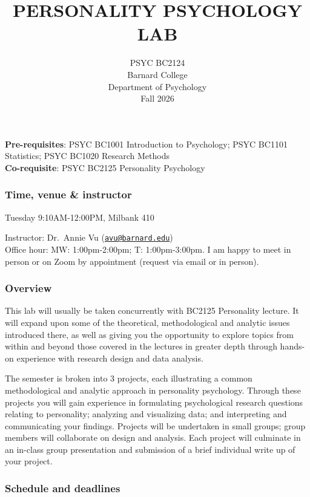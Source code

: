 \documentclass[
  letterpaper,
  DIV=11,
  numbers=noendperiod]{scrartcl}
\title{PERSONALITY PSYCHOLOGY LAB}
\subtitle{PSYC BC2124\\
Barnard College\\
Department of Psychology\\
Fall 2026}
\author{}
\date{}
\begin{document}
\maketitle


\textbf{Pre-requisites}: PSYC BC1001 Introduction to Psychology; PSYC
BC1101 Statistics; PSYC BC1020 Research Methods\\
\textbf{Co-requisite}: PSYC BC2125 Personality Psychology

\subsubsection{Time, venue \& instructor}\label{time-venue-instructor}

Tuesday 9:10AM-12:00PM, Milbank 410

Instructor: Dr.~Annie Vu
(\href{mailto:avu@barnard.edu}{\nolinkurl{avu@barnard.edu}})\\
Office hour: MW: 1:00pm-2:00pm; T: 1:00pm-3:00pm. I am happy to meet in person or on Zoom by appointment (request via email or in person).



\subsubsection{Overview}\label{overview}

This lab will usually be taken concurrently with BC2125 Personality
lecture. It will expand upon some of the theoretical, methodological and
analytic issues introduced there, as well as giving you the opportunity
to explore topics from within and beyond those covered in the lectures
in greater depth through hands-on experience with research design and
data analysis.

The semester is broken into 3 projects, each illustrating a common
methodological and analytic approach in personality psychology. Through
these projects you will gain experience in formulating psychological
research questions relating to personality; analyzing and visualizing
data; and interpreting and communicating your findings. Projects will be
undertaken in small groups; group members will collaborate on design and
analysis. Each project will culminate in an in-class group presentation
and submission of a brief individual write up of your project.

\subsubsection{Schedule and deadlines}\label{schedule-and-deadlines}
\end{document}
